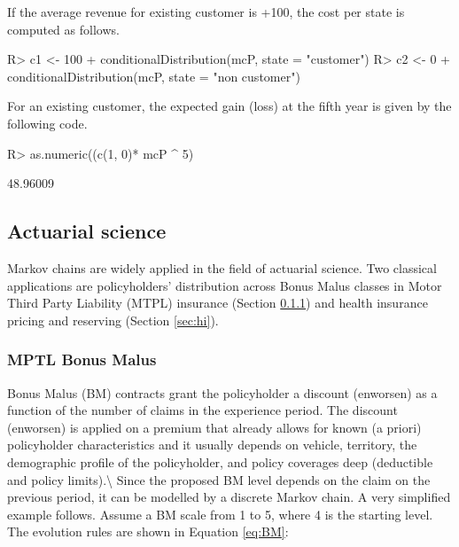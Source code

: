 \documentclass[article,nojss]{jss}
\begin{document}
If the average revenue for existing customer is +100, the cost per state is computed as follows.

\begin{CodeChunk}

\begin{CodeInput}
R> c1 <- 100 + conditionalDistribution(mcP, state = "customer") %
R> c2 <- 0 + conditionalDistribution(mcP, state = "non customer") %
\end{CodeInput}
\end{CodeChunk}

For an existing customer, the expected gain (loss) at the fifth year is given by the following code.

\begin{CodeChunk}

\begin{CodeInput}
R> as.numeric((c(1, 0)* mcP ^ 5) %
\end{CodeInput}

\begin{CodeOutput}
[1] 48.96009
\end{CodeOutput}
\end{CodeChunk}

\hypertarget{app:act}{%
\subsection{Actuarial science}\label{app:act}}

Markov chains are widely applied in the field of actuarial science. Two
classical applications are policyholders' distribution across Bonus Malus
classes in Motor Third Party Liability (MTPL) insurance (Section \ref{sec:bm}) and health insurance pricing and reserving
(Section \ref{sec:hi}).

\hypertarget{sec:bm}{%
\subsubsection{MPTL Bonus Malus}\label{sec:bm}}

Bonus Malus (BM) contracts grant the policyholder a discount (enworsen) as a function of the number of claims in the experience period. The discount (enworsen) is applied on a premium that already allows for known (a priori) policyholder characteristics \citep{denuit2007actuarial} and it usually depends on vehicle, territory, the demographic profile of the policyholder, and policy coverages deep (deductible and policy limits).\textbackslash{}
Since the proposed BM level depends on the claim on the previous period, it can be modelled by a discrete Markov chain. A very simplified example follows. Assume a BM scale from 1 to 5, where 4 is the starting level. The evolution rules are shown in Equation \ref{eq:BM}:
\end{document}
